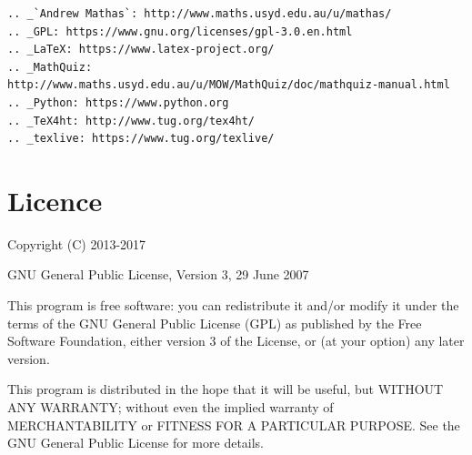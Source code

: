\documentclass[svgnames]{article}
\begin{document}
    

\begin{verbatim}
.. _`Andrew Mathas`: http://www.maths.usyd.edu.au/u/mathas/
.. _GPL: https://www.gnu.org/licenses/gpl-3.0.en.html
.. _LaTeX: https://www.latex-project.org/
.. _MathQuiz: http://www.maths.usyd.edu.au/u/MOW/MathQuiz/doc/mathquiz-manual.html
.. _Python: https://www.python.org
.. _TeX4ht: http://www.tug.org/tex4ht/
.. _texlive: https://www.tug.org/texlive/
\end{verbatim}

\section{Licence}

Copyright (C) 2013-2017

GNU General Public License, Version 3, 29 June 2007

This program is free software: you can redistribute it and/or modify it under
the terms of the GNU General Public License (GPL) as published by the Free
Software Foundation, either version 3 of the License, or (at your option) any
later version.

This program is distributed in the hope that it will be useful, but WITHOUT ANY
WARRANTY; without even the implied warranty of MERCHANTABILITY or FITNESS FOR A
PARTICULAR PURPOSE.  See the GNU General Public License for more details.
\end{document}
